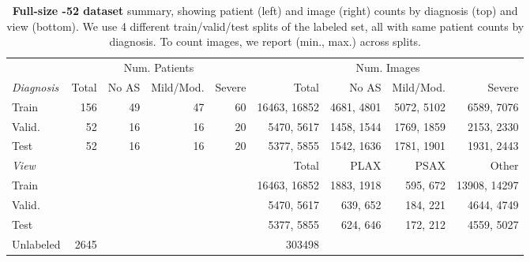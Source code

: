 \begin{table}[!t]
{\begin{tabular}{l|r|rrr|r|rrr}
		& \multicolumn{4}{c|}{Num. Patients}
		& \multicolumn{4}{c}{Num. Images}
	\\
    \textit{Diagnosis}
    	& Total
    	& No AS  & Mild/Mod. & Severe    	
    	& Total
    	& No AS  & Mild/Mod. & Severe \\
    \hline
    Train
        & 156 & 49 & 47 & 60
    	& 16463, 16852
    	& 4681, 4801 & 5072, 5102 & 6589, 7076
    \\
    Valid.
	    & 52 & 16 & 16 & 20
    	& 5470, 5617
    	& 1458, 1544 & 1769, 1859 & 2153, 2330
    \\
    Test
	    & 52 & 16 & 16 & 20
    	& 5377, 5855
    	& 1542, 1636 & 1781, 1901 & 1931, 2443
	\\ \hline
    \textit{View}
		& & & &
    	& Total
    	& PLAX  & PSAX & Other
    \\ \hline
    Train
		& & & &
    	& 16463, 16852
    	& 1883, 1918 & 595, 672 & 13908, 14297
    \\
    Valid.
		&  & &  &
    	& 5470, 5617
    	& 639, 652 & 184, 221 & 4644, 4749
	\\
    Test
		& & & &
    	& 5377, 5855
    	& 624, 646 & 172, 212 & 4559, 5027
    \\
    \hline
    Unlabeled & 2645 &  &  &  & 303498
    \end{tabular}
    }%
    \caption{\textbf{Full-size -52 dataset} summary, showing patient (left) and image (right) counts by diagnosis (top) and view (bottom).
    We use 4 different train/valid/test splits of the labeled set, all with same patient counts by diagnosis. To count images, we report (min., max.) across splits.
    }    
    \label{tab:image_counts_large}
	\label{tab:patient_counts_large}
\end{table}



